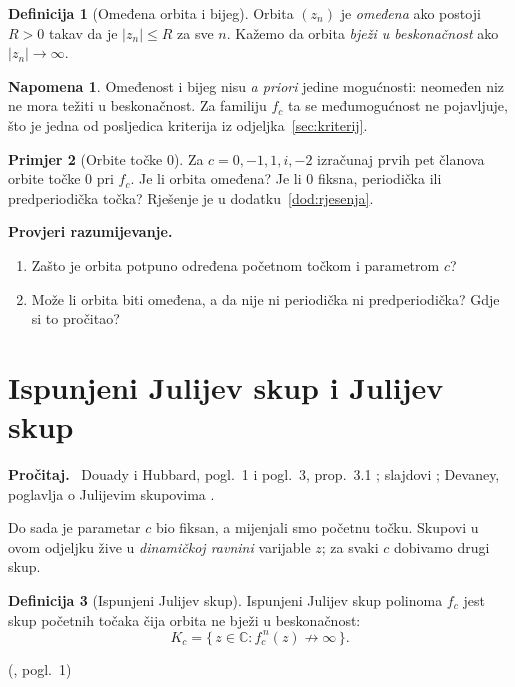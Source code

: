 \documentclass[11pt,a4paper]{article}
\theoremstyle{definition}
\newtheorem{definicija}{Definicija}[section]
\newtheorem{primjer}[definicija]{Primjer}
\newtheorem*{napomena}{Napomena}
\theoremstyle{plain}
\newenvironment{citaj}
  {\par\medskip\noindent\textbf{\color{blue!60!black}Pročitaj.}\ }
  {\par\medskip}
\newenvironment{pitanja}
  {\par\noindent\textbf{\color{orange!70!black}Provjeri razumijevanje.}
   \begin{enumerate}[label=\arabic*., nosep]}
  {\end{enumerate}\medskip}
\newcommand{\mjesto}[2]{{\small(\cite{#1}, #2)}}
\newcommand{\C}{\mathbb{C}}
\begin{document}
\begin{definicija}[Omeđena orbita i bijeg]
Orbita $(z_n)$ je \emph{omeđena} ako postoji $R > 0$ takav da je
$|z_n| \le R$ za sve $n$. Kažemo da orbita \emph{bježi u beskonačnost} ako
$|z_n| \to \infty$.
\end{definicija}

\begin{napomena}
Omeđenost i bijeg nisu \emph{a priori} jedine mogućnosti: neomeđen niz ne mora
težiti u beskonačnost. Za familiju $f_c$ ta se međumogućnost ne pojavljuje,
što je jedna od posljedica kriterija iz odjeljka~\ref{sec:kriterij}.
\end{napomena}

\begin{primjer}[Orbite točke $0$]
\label{pr:orbite}
Za $c = 0, -1, 1, i, -2$ izračunaj prvih pet članova orbite točke $0$ pri
$f_c$. Je li orbita omeđena? Je li $0$ fiksna, periodička ili predperiodička
točka? Rješenje je u dodatku~\ref{dod:rjesenja}.
\end{primjer}

\begin{pitanja}
  \item Zašto je orbita potpuno određena početnom točkom i parametrom $c$?
  \item Može li orbita biti omeđena, a da nije ni periodička ni
        predperiodička? Gdje si to pročitao?
\end{pitanja}

\section{Ispunjeni Julijev skup i Julijev skup}
\label{sec:julia}

\begin{citaj}
Douady i Hubbard, pogl.~1 i pogl.~3, prop.~3.1 \cite{douady_hubbard_orsay};
slajdovi \cite{rosehulman_julia}; Devaney, poglavlja o Julijevim skupovima
\cite{devaney_first_course}.
\end{citaj}

Do sada je parametar $c$ bio fiksan, a mijenjali smo početnu točku. Skupovi u
ovom odjeljku žive u \emph{dinamičkoj ravnini} varijable $z$; za svaki $c$
dobivamo drugi skup.

\begin{definicija}[Ispunjeni Julijev skup]
\label{def:Kc}
Ispunjeni Julijev skup polinoma $f_c$ jest skup početnih točaka čija orbita
ne bježi u beskonačnost:
\[
  K_c = \{\, z \in \C : f_c^{\,n}(z) \not\to \infty \,\}.
\]
\end{definicija}
\mjesto{douady_hubbard_orsay}{pogl.~1}
\end{document}
